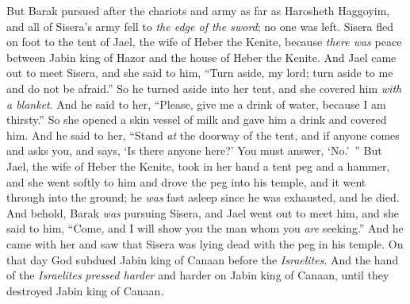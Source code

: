 \begin{biblechapter}
\verse But Barak pursued after the chariots and army as far as Harosheth Haggoyim, and all of Sisera’s army fell to \textit{the edge of the sword}; no one was left.
\verse Sisera fled on foot to the tent of Jael, the wife of Heber the Kenite, because \textit{there was} peace between Jabin king of Hazor and the house of Heber the Kenite.
\verse And Jael came out to meet Sisera, and she said to him, “Turn aside, my lord; turn aside to me and do not be afraid.” So he turned aside into her tent, and she covered him \textit{with a blanket}.
\verse And he said to her, “Please, give me a drink of water, because I am thirsty.” So she opened a skin vessel of milk and gave him a drink and covered him.
\verse And he said to her, “Stand \textit{at} the doorway of the tent, and if anyone comes and asks you, and says, ‘Is there anyone here?’ You must answer, ‘No.’ ”
\verse But Jael, the wife of Heber the Kenite, took in her hand a tent peg and a hammer, and she went softly to him and drove the peg into his temple, and it went through into the ground; he \textit{was} fast asleep since he was exhausted, and he died.
\verse And behold, Barak \textit{was} pursuing Sisera, and Jael went out to meet him, and she said to him, “Come, and I will show you the man whom you \textit{are} seeking.” And he came with her and saw that Sisera was lying dead with the peg in his temple.
\verse On that day God subdued Jabin king of Canaan before the \textit{Israelites}.
\verse And the hand of the \textit{Israelites} \textit{pressed harder} and harder on Jabin king of Canaan, until they destroyed Jabin king of Canaan.
\end{biblechapter}

